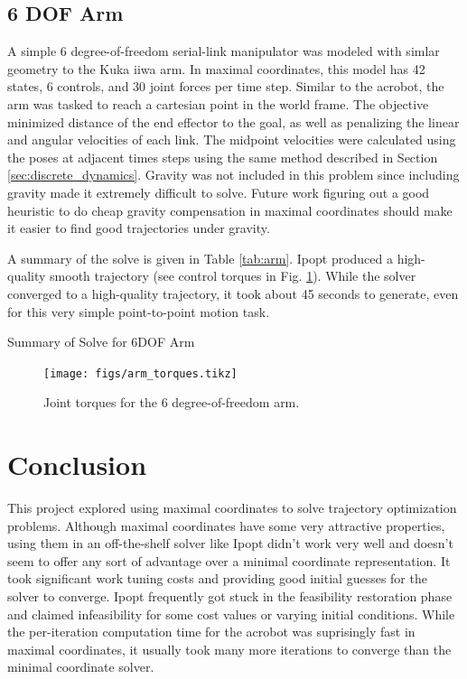 \documentclass[conference]{IEEEtran}
\begin{document}
\subsection{6 DOF Arm}
A simple 6 degree-of-freedom serial-link manipulator was modeled with simlar geometry to the
Kuka iiwa arm. In maximal coordinates, this model has 42 states, 6 controls, and 30 joint 
forces per time step. Similar to the acrobot, the arm was tasked to reach a cartesian point
in the world frame. The objective minimized distance of the end effector to the goal, as 
well as penalizing the linear and angular velocities of each link. The midpoint velocities 
were calculated using the poses at adjacent times steps using the same method described in 
Section \ref{sec:discrete_dynamics}. Gravity was not included in this problem since 
including gravity made it extremely difficult to solve. Future work figuring out a good 
heuristic to do cheap gravity compensation in maximal coordinates should make it easier to
find good trajectories under gravity. 

A summary of the solve is given in Table \ref{tab:arm}. Ipopt produced a high-quality
smooth trajectory (see control torques in Fig. \ref{fig:arm_torques}). While the solver converged
to a high-quality trajectory, it took about 45 seconds to generate, even for this very simple 
point-to-point motion task. 

\begin{table}
    \centering 
    \caption{Summary of Solve for 6DOF Arm}
    
    \label{tab:arm}
\end{table}

\begin{figure}
    \centering
    \texttt{[image: figs/arm\_torques.tikz]}
    \caption{Joint torques for the 6 degree-of-freedom arm.}
    \label{fig:arm_torques}
\end{figure}

\section{Conclusion}
This project explored using maximal coordinates to solve trajectory optimization problems.
Although maximal coordinates have some very attractive properties, using them in an 
off-the-shelf solver like Ipopt didn't work very well and doesn't seem to offer any sort of 
advantage over a minimal coordinate representation. It took significant work tuning costs
and providing good initial guesses for the solver to converge. Ipopt frequently got stuck 
in the feasibility restoration phase and claimed infeasibility for some cost values or 
varying initial conditions. While the per-iteration computation time for the acrobot was 
suprisingly fast in maximal coordinates, it usually took many more iterations to converge 
than the minimal coordinate solver. 
\end{document}

